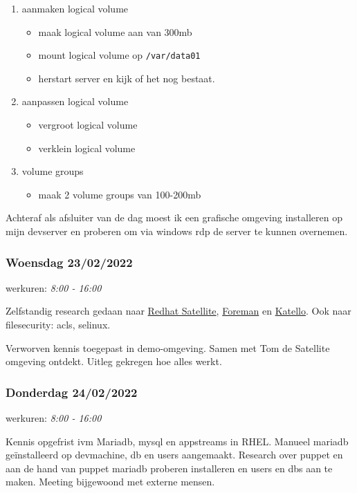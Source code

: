 \begin{enumerate}
    \item aanmaken logical volume
    \begin{itemize}
        \item maak logical volume aan van 300mb
        \item mount logical volume op \texttt{/var/data01}
        \item herstart server en kijk of het nog bestaat.
    \end{itemize}
    \item aanpassen logical volume
    \begin{itemize}
        \item vergroot logical volume
        \item verklein logical volume
    \end{itemize}
    \item volume groups
    \begin{itemize}
        \item maak 2 volume groups van 100-200mb
    \end{itemize}
\end{enumerate}

Achteraf als afsluiter van de dag moest ik een grafische omgeving installeren op mijn devserver en proberen om via windows \gls{rdp} de server te kunnen overnemen.

\subsubsection{Woensdag 23/02/2022}

werkuren: \emph{8:00 - 16:00}

Zelfstandig research gedaan naar
\href{https://www.redhat.com/en/technologies/management/satellite}{Redhat
    Satellite}, \href{https://theforeman.org}{Foreman} en
\href{https://www.theforeman.org/plugins/katello/}{Katello}. Ook naar
filesecurity: \glspl{acl}, \gls{selinux}.

Verworven kennis toegepast in demo-omgeving. Samen met Tom de Satellite
omgeving ontdekt. Uitleg gekregen hoe alles werkt.

\subsubsection{Donderdag 24/02/2022}

werkuren: \emph{8:00 - 16:00}

Kennis opgefrist ivm Mariadb, mysql en appstreams in RHEL. Manueel
mariadb geïnstalleerd op devmachine, \gls{db} en users aangemaakt. Research
over puppet en aan de hand van puppet mariadb proberen installeren en
users en \glspl{db} aan te maken. Meeting bijgewoond met externe mensen.

